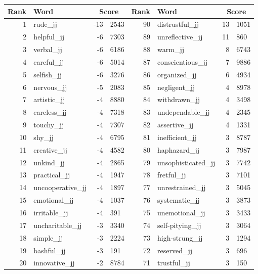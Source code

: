 \begin{table}[tbp]
    \begin{tabular}{| rlr@{.}l | rlr@{.}l |}
    \hline
    \textbf{Rank} & \textbf{Word} & \multicolumn{2}{c|}{\textbf{Score}} & \textbf{Rank} & \textbf{Word} & \multicolumn{2}{c|}{\textbf{Score}} \\
    \hline
    1 & rude\_jj & -13 & 2543    &    90 & distrustful\_jj & 13 & 1051 \\
    2 & helpful\_jj & -6 & 7303    &    89 & unreflective\_jj & 11 & 860 \\
    3 & verbal\_jj & -6 & 6186    &    88 & warm\_jj & 8 & 6743 \\
    4 & careful\_jj & -6 & 5014    &    87 & conscientious\_jj & 7 & 9886 \\
    5 & selfish\_jj & -6 & 3276    &    86 & organized\_jj & 6 & 4934 \\
    6 & nervous\_jj & -5 & 2083    &    85 & negligent\_jj & 4 & 8978 \\
    7 & artistic\_jj & -4 & 8880    &    84 & withdrawn\_jj & 4 & 3498 \\
    8 & careless\_jj & -4 & 7318    &    83 & undependable\_jj & 4 & 2345 \\
    9 & touchy\_jj & -4 & 7307    &    82 & assertive\_jj & 4 & 1331 \\
    10 & shy\_jj & -4 & 6795    &    81 & inefficient\_jj & 3 & 8787 \\
    11 & creative\_jj & -4 & 4582    &    80 & haphazard\_jj & 3 & 7987 \\
    12 & unkind\_jj & -4 & 2865    &    79 & unsophisticated\_jj & 3 & 7742 \\
    13 & practical\_jj & -4 & 1947    &    78 & fretful\_jj & 3 & 7101 \\
    14 & uncooperative\_jj & -4 & 1897    &    77 & unrestrained\_jj & 3 & 5045 \\
    15 & emotional\_jj & -4 & 1037    &    76 & systematic\_jj & 3 & 3873 \\
    16 & irritable\_jj & -4 & 391    &    75 & unemotional\_jj & 3 & 3433 \\
    17 & uncharitable\_jj & -3 & 3340    &    74 & self-pitying\_jj & 3 & 3064 \\
    18 & simple\_jj & -3 & 2224    &    73 & high-strung\_jj & 3 & 1294 \\
    19 & bashful\_jj & -3 & 191    &    72 & reserved\_jj & 3 & 696 \\
    20 & innovative\_jj & -2 & 8784    &    71 & trustful\_jj & 3 & 150 \\

\end{tabular}
\end{table}
